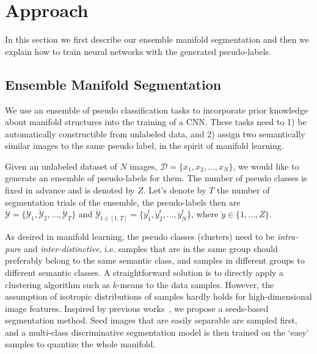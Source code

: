 \documentclass{bmvc2k}
\begin{document}
\section{Approach} 
\label{sec:method}

In this section we first describe our ensemble manifold segmentation and then we explain how to train neural networks with the generated
pseudo-labels.

\noindent
\subsection{Ensemble Manifold Segmentation}
\label{sec:seg} 

We use an ensemble of pseudo classification tasks to incorporate prior
knowledge about manifold structures into the training of a CNN. These tasks 
need to 1) be automatically constructible from unlabeled data, and 
2)  assign two semantically 
similar images to the same pseudo label, in the spirit of manifold learning.

Given an unlabeled dataset of $N$ images, $\mathcal{D}=\{x_1, x_2, ...,
x_N\}$, we would like to generate an ensemble of pseudo-labels for
them. The number of pseudo classes is fixed in advance and is denoted by $Z$.  
Let's denote by $T$ the number of segmentation trials of the ensemble, the pseudo-labels then are $\dot{\mathcal{Y}}=\{\dot{\mathcal{Y}}_1,
\dot{\mathcal{Y}}_2, ..., \dot{\mathcal{Y}}_T\}$ and $\dot{\mathcal{Y}}_{t \in [1,T]}=\{ \dot{y}_1^t, \dot{y}_2^t, ..., \dot{y}_N^t \}$,
where $\dot{y} \in \{1, ..., Z\}$. 

As desired in manifold learning, the pseudo classes (clusters) need to be \emph{intra-pure} 
and \emph{inter-distinctive}, i.e. samples that are in the same group should
preferably belong to the same semantic class, and samples in different groups 
to different semantic classes. A straightforward solution is to directly apply a clustering algorithm such as $k$-means to the data samples. However, the assumption of isotropic distributions of samples hardly holds for high-dimensional image features. Inspired by previous works~\cite{dai:ensemble:eccv12,dai:EnPro:iccv13}, we propose a seeds-based segmentation method. Seed images that are easily separable are sampled first, and a multi-class discriminative segmentation model is then trained on the `easy' samples to quantize the whole manifold.
\end{document}
